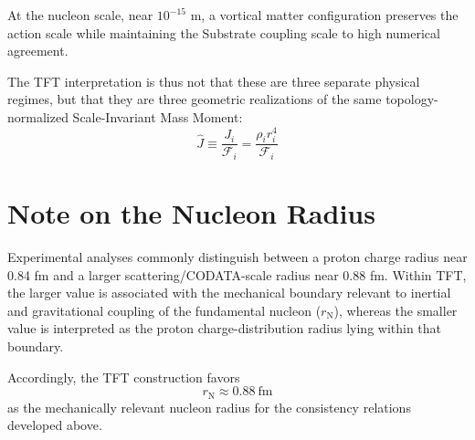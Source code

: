 At the nucleon scale, near $10^{-15}$ m, a vortical matter configuration preserves the action scale while maintaining the Substrate coupling scale to high numerical agreement.

The TFT interpretation is thus not that these are three separate physical regimes, but that they are three geometric realizations of the same topology-normalized Scale-Invariant Mass Moment:
\begin{equation}
    \hat{J} \equiv \frac{J_i}{\mathcal{F}_i} = \frac{\rho_i r_i^4}{\mathcal{F}_i}
\end{equation}

\section{Note on the Nucleon Radius}
Experimental analyses commonly distinguish between a proton charge radius near 0.84 fm and a larger scattering/CODATA-scale radius near 0.88 fm. Within TFT, the larger value is associated with the mechanical boundary relevant to inertial and gravitational coupling of the fundamental nucleon ($r_{\mathrm{N}}$), whereas the smaller value is interpreted as the proton charge-distribution radius lying within that boundary.

Accordingly, the TFT construction favors
\begin{equation}
    r_{\mathrm{N}} \approx 0.88\ \text{fm}
\end{equation}
as the mechanically relevant nucleon radius for the consistency relations developed above.